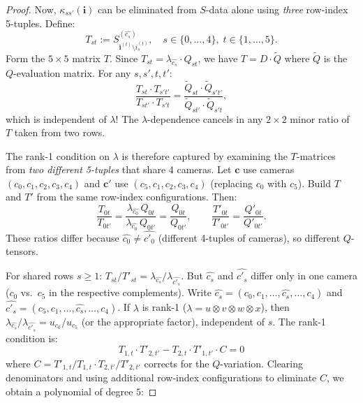 \begin{proof}
Now, $\kappa_{ss'}(\mathbf{i})$ can be eliminated from $S$-data alone using
\emph{three} row-index 5-tuples. Define:
\begin{equation}\label{eq:p9-Tdef}
  T_{st} := S^{(\widehat{c_s})}_{\mathbf{i}^{(t)}\setminus i^{(t)}_s},
  \quad s\in\{0,\ldots,4\},\; t\in\{1,\ldots,5\}.
\end{equation}
Form the $5\times 5$ matrix $T$. Since $T_{st} = \lambda_{\widehat{c_s}}\cdot Q_{st}$,
we have $T = D\cdot \widetilde{Q}$ where $\widetilde{Q}$ is the $Q$-evaluation matrix.
For any $s,s',t,t'$:
\begin{equation}\label{eq:p9-ratio}
  \frac{T_{st}\cdot T_{s't'}}{T_{st'}\cdot T_{s't}}
  = \frac{\widetilde{Q}_{st}\cdot\widetilde{Q}_{s't'}}
  {\widetilde{Q}_{st'}\cdot\widetilde{Q}_{s't}},
\end{equation}
which is independent of $\lambda$! The $\lambda$-dependence cancels in
any $2\times 2$ minor ratio of $T$ taken from two rows.

The rank-1 condition on $\lambda$ is therefore captured by examining the
$T$-matrices from \emph{two different 5-tuples} that share 4 cameras.
Let $\mathbf{c}$ use cameras $(c_0,c_1,c_2,c_3,c_4)$ and $\mathbf{c}'$
use $(c_5,c_1,c_2,c_3,c_4)$ (replacing $c_0$ with $c_5$). Build
$T$ and $T'$ from the same row-index configurations. Then:
\[
  \frac{T_{0t}}{T_{0t'}} = \frac{\lambda_{\widehat{c_0}}\,Q_{0t}}{\lambda_{\widehat{c_0}}\,Q_{0t'}}
  = \frac{Q_{0t}}{Q_{0t'}},
  \qquad
  \frac{T'_{0t}}{T'_{0t'}} = \frac{Q'_{0t}}{Q'_{0t'}}.
\]
These ratios differ because $\widehat{c_0} \neq \widehat{c'_0}$ (different
4-tuples of cameras), so different $Q$-tensors.

For shared rows $s\geq 1$: $T_{st}/T'_{st} = \lambda_{\widehat{c_s}}/\lambda_{\widehat{c'_s}}$.
But $\widehat{c_s}$ and $\widehat{c'_s}$ differ only in one camera
($c_0$ vs.\ $c_5$ in the respective complements). Write
$\widehat{c_s} = (c_0,c_1,\ldots,\widehat{c_s},\ldots,c_4)$ and
$\widehat{c'_s} = (c_5,c_1,\ldots,\widehat{c_s},\ldots,c_4)$.
If $\lambda$ is rank-1 ($\lambda = u\otimes v\otimes w\otimes x$), then
$\lambda_{\widehat{c_s}}/\lambda_{\widehat{c'_s}} = u_{c_0}/u_{c_5}$
(or the appropriate factor), independent of $s$. The rank-1 condition is:
\begin{equation}\label{eq:p9-rank1test}
  T_{1,t}\cdot T'_{2,t'} - T_{2,t}\cdot T'_{1,t'} \cdot C = 0
\end{equation}
where $C = T'_{1,t}/T_{1,t} \cdot T_{2,t'}/T'_{2,t'}$ corrects for the
$Q$-variation. Clearing denominators and using additional row-index
configurations to eliminate $C$, we obtain a polynomial of degree $5$:


\end{proof}
